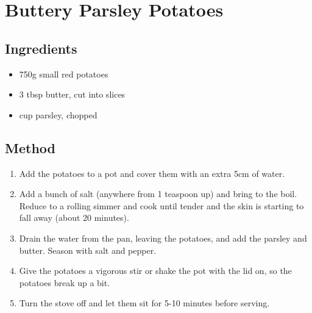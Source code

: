 \clearpage
\section{Buttery Parsley Potatoes}
\begin{multicols}{2}
  \subsection{Ingredients}
    \begin{itemize}
      \item 750g small red potatoes
      \item 3 tbsp butter, cut into slices
      \item {} cup parsley, chopped
    \end{itemize}
  \vfill\null
  \columnbreak
  \subsection{Method}
    \begin{enumerate}
      \item Add the potatoes to a pot and cover them with an extra 5cm of water.
      \item Add a bunch of salt (anywhere from 1 teaspoon up) and bring to the boil. Reduce to a rolling simmer and cook until tender and the skin is starting to fall away (about 20 minutes).
      \item Drain the water from the pan, leaving the potatoes, and add the parsley and butter. Season with salt and pepper.
      \item Give the potatoes a vigorous stir or shake the pot with the lid on, so the potatoes break up a bit.
      \item Turn the stove off and let them sit for 5-10 minutes before serving.
    \end{enumerate}
  \end{multicols}
